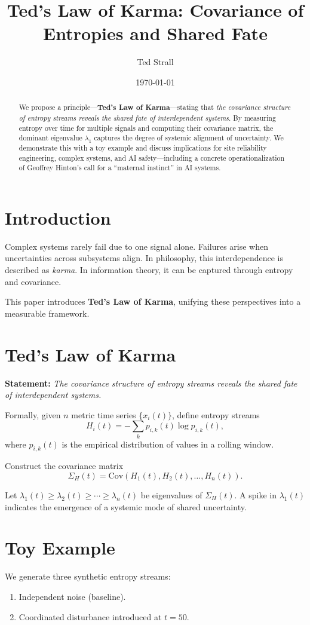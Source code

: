 \documentclass[11pt]{article}
\title{Ted's Law of Karma: Covariance of Entropies and Shared Fate}
\author{Ted Strall}
\date{\today}
\begin{document}
\maketitle

\begin{abstract}
We propose a principle---\textbf{Ted's Law of Karma}---stating that 
\emph{the covariance structure of entropy streams reveals the shared fate of interdependent systems}.
By measuring entropy over time for multiple signals and computing their covariance matrix, 
the dominant eigenvalue $\lambda_1$ captures the degree of systemic alignment of uncertainty. 
We demonstrate this with a toy example and discuss implications for site reliability engineering, 
complex systems, and AI safety---including a concrete operationalization of Geoffrey Hinton's call 
for a ``maternal instinct'' in AI systems.
\end{abstract}

\section{Introduction}
Complex systems rarely fail due to one signal alone. Failures arise when uncertainties across subsystems align.
In philosophy, this interdependence is described as \emph{karma}. 
In information theory, it can be captured through entropy and covariance.

This paper introduces \textbf{Ted's Law of Karma}, unifying these perspectives into a 
measurable framework.

\section{Ted's Law of Karma}
\textbf{Statement:} \emph{The covariance structure of entropy streams reveals the shared fate of interdependent systems.}

Formally, given $n$ metric time series $\{x_i(t)\}$, define entropy streams
\[
H_i(t) = - \sum_{k} p_{i,k}(t) \log p_{i,k}(t),
\]
where $p_{i,k}(t)$ is the empirical distribution of values in a rolling window.

Construct the covariance matrix
\[
\Sigma_H(t) = \text{Cov}(H_1(t), H_2(t), \ldots, H_n(t)).
\]

Let $\lambda_1(t) \ge \lambda_2(t) \ge \cdots \ge \lambda_n(t)$ be eigenvalues of $\Sigma_H(t)$. 
A spike in $\lambda_1(t)$ indicates the emergence of a systemic mode of shared uncertainty.

\section{Toy Example}
We generate three synthetic entropy streams:
\begin{enumerate}
    \item Independent noise (baseline).
    \item Coordinated disturbance introduced at $t=50$.
\end{enumerate}
\end{document}
